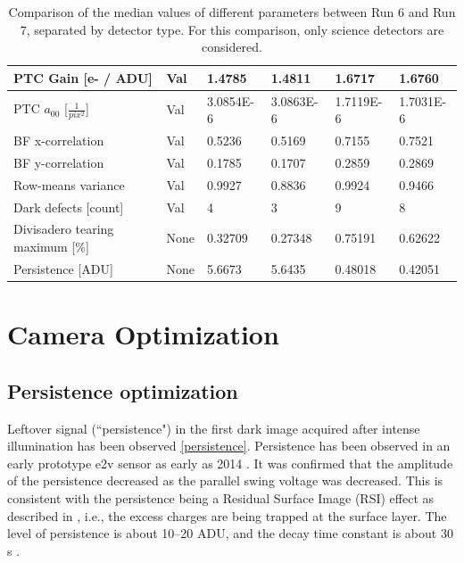 \begin{table}[H]
{\begin{tabular}{|l|l|ll|ll|}
PTC Gain {[}e- / ADU{]}            & Val               & \multicolumn{1}{l|}{1.4785}    & 1.4811    & \multicolumn{1}{l|}{1.6717}    & 1.6760     \\ \hline
PTC $a_{00}$ [$\frac{1}{pix^2}$]   & Val               & \multicolumn{1}{l|}{3.0854E-6} & 3.0863E-6 & \multicolumn{1}{l|}{1.7119E-6} & 1.7031E-6  \\ \hline
BF x-correlation                   & Val               & \multicolumn{1}{l|}{0.5236}    & 0.5169    & \multicolumn{1}{l|}{0.7155}    & 0.7521     \\ \hline
BF y-correlation                   & Val               & \multicolumn{1}{l|}{0.1785}    & 0.1707    & \multicolumn{1}{l|}{0.2859}    & 0.2869     \\ \hline
Row-means variance                 & Val               & \multicolumn{1}{l|}{0.9927}    & 0.8836    & \multicolumn{1}{l|}{0.9924}    & 0.9466     \\ \hline
Dark defects {[}count{]}           & Val               & \multicolumn{1}{l|}{4} & 3 & \multicolumn{1}{l|}{9} & 8  \\ \hline
Divisadero tearing maximum {[}\%{]}& None               & \multicolumn{1}{l|}{0.32709}   & 0.27348   & \multicolumn{1}{l|}{0.75191}   & 0.62622    \\ \hline
Persistence {[}ADU{]}              & None               & \multicolumn{1}{l|}{5.6673}    & 5.6435    & \multicolumn{1}{l|}{0.48018}   & 0.42051    \\ \hline
\end{tabular}
}
\caption{Comparison of the median values of different parameters between Run 6 and Run 7, separated by detector type. For this comparison, only science detectors are considered.}
\end{table}


\section{Camera Optimization}\label{sec:camera-optimization}

\subsection{Persistence optimization}\label{sec:persistence-optimization}


Leftover signal (``persistence") in the first dark image acquired after intense illumination has
been observed \ref{persistence}.  Persistence has been observed
in an early prototype e2v sensor as early as 2014
\citep{2014SPIE.9154E..18D}. It was confirmed that the amplitude of
the persistence decreased as the parallel swing voltage was decreased.
This is consistent with the persistence being a Residual Surface Image (RSI) effect as described in
\citep{2001sccd.book.....J}, i.e., the excess charges are being trapped
at the surface layer. The level of persistence is about 10--20 ADU,
and the decay time constant is about 30\,s
\citep{dmtn-276}.

